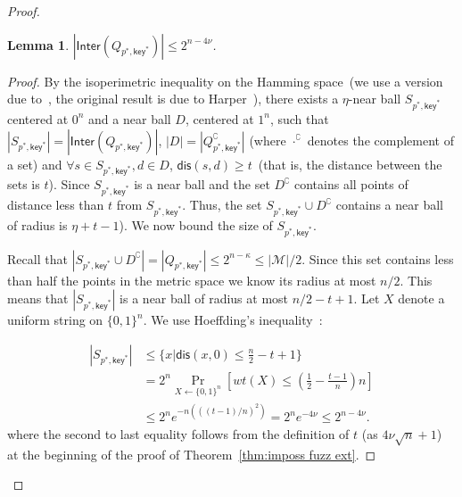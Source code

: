 \documentclass[11pt]{article}
\newtheorem{lemma}[theorem]{Lemma}
\newcommand{\class}[1]{{\ensuremath{\mathsf{#1}}}}
\newcommand{\key}{\ensuremath{\class{key}}\xspace}
\newcommand{\inter}{\ensuremath{\class{Inter}}\xspace}
\newcommand{\zo}{\ensuremath{\{0, 1\}}}
\newcommand{\dis}{\ensuremath{\mathsf{dis}}}
\begin{document}
\begin{proof}
\begin{lemma}
$|\inter(Q_{p^*, \key^*})| \le 2^{n-4\nu}$.
\end{lemma}
\begin{proof}
By the isoperimetric inequality on the Hamming space~(we use a version
due to~\cite[Theorem 1]{frankl1981short}, the original result is due
to Harper~\cite{harper1966optimal}), there exists a $\eta$-near
ball $S_{p^*, \key^*}$ centered at $0^n$ and a near ball $D$,
centered at $1^n$, such that
$|S_{p^*, \key^*}| = |\inter(Q_{p^*, \key^*})|$, $|D| = |Q_{p^*,
  \key^*}^\complement|$ (where $\cdot^\complement$ denotes the
complement of a set) and $\forall s\in S_{p^*, \key^*}, d\in D$,
$\dis(s, d) \ge t$~(that is, the distance between the sets is $t$).  Since $S_{p^*, \key^*}$ is a near ball and the set $D^\complement$ contains all points of distance less than $t$ from $S_{p^*, \key^*}$.  Thus, the set $S_{p^*, \key^*} \cup D^\complement$ contains a near ball of radius is $\eta+t-1$).
We now bound the size of $S_{p^*, \key^*}$.

Recall that $|S_{p^*, \key^*} \cup D^\complement| = |Q_{p^*, \key^*} | \le 2^{n-\kappa}\leq |\mathcal{M}|/2$.  Since this set contains less than half the points in the metric space we know its radius at most $n/2$.  This means that $|S_{p^*, \key^*}|$ is a near ball of radius at most $n/2-t+1$.  Let $X$ denote a uniform string on $\zo^n$.  We use Hoeffding's inequality~\cite{hoeffding1963probability}:

\begin{align*}
|S_{p^*, \key^*}| &\le \{ x | \dis (x, 0)\le \frac{n}{2}-t+1\}\\&= 2^n \Pr_{X\leftarrow \zo^n} [ wt(X) \le (\frac{1}{2}-\frac{t-1}{n})n] \\
&\le 2^n e^{-n (((t-1)/n)^2)} = 2^n e^{-4\nu} \le 2^{n - 4\nu}.
\end{align*}
where the second to last equality follows from the definition of $t$
(as $4\nu \sqrt{n}+1$) at the beginning of the proof of Theorem~\ref{thm:imposs fuzz ext}.
\end{proof}


\end{proof}
\end{document}
